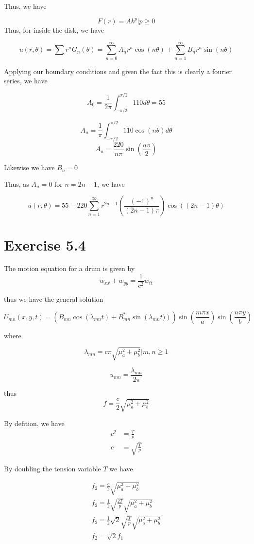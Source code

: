 \documentclass{article}
\begin{document}
Thus, we have

$$F(r) = A k^p\Bigr| p \geq 0$$
Thus, for inside the disk, we have

$$u(r,\theta) = \sum r^n G_n(\theta) = \sum_{n=0}^{\infty} A_n r^n \cos(n \theta) + \sum_{n=1}^{\infty} B_n r^n \sin (n\theta)$$

Applying our boundary conditions and given the fact this is clearly a fourier series, we have

$$A_0 = \frac{1}{2\pi} \int_{-\pi/2}^{\pi/2} 110 d\theta = 55$$

$$A_n= \frac{1}{\pi} \int_{-\pi/2}^{\pi/2} 110 \cos(n\theta) d\theta$$
$$A_n = \frac{220}{n \pi} \sin\left(\frac{n\pi}{2}\right)$$

Likewise we have $B_n = 0$

Thus, as $A_n=0$ for $n=2n-1$, we have

$$u(r,\theta) = 55 -220 \sum_{n=1}^{\infty} r^{2n-1} \left(\frac{(-1)^n}{(2n-1)\pi}\right) \cos((2n-1)\theta)$$



\section*{Exercise 5.4}
The motion equation for a drum is given by
$$
w_{xx}+w_{yy}=\frac{1}{c^2}w_{tt}
$$

thus we have the general solution

$$
U_{mn}(x,y,t) = \left(B_{mn}\cos(\lambda_{mn}t)+B^{*}_{mn}\sin\left(\lambda_{mn}t)\right)\right)\sin\left(\frac{m \pi x}{a}\right)\sin\left(\frac{n \pi y}{b}\right)
$$

where

$$
\lambda_{mn} = c\pi \sqrt{\mu_a^2 + \mu_b^2}\Bigr| m,n \geq 1
$$

$$
u_{mn} = \frac{\lambda_{mn}}{2\pi }
$$

thus
$$
f = \frac{c}{2} \sqrt{\mu_a^2 + \mu_b^2}
$$

By defition, we have 
\begin{align*}
c^2 &= \frac{T}{p}\\
c &= \sqrt{\frac{T}{p}}
\end{align*}

By doubling the tension variable $T$ we have

\begin{align*}
f_2 = \frac{c}{2} \sqrt{\mu_a^2 + \mu_b^2} \\
f_2 = \frac{1}{2} \sqrt{\frac{2T}{p}}\sqrt{\mu_a^2 + \mu_b^2} \\
f_2 = \frac{1}{2} \sqrt{2} \sqrt{\frac{T}{p}}\sqrt{\mu_a^2 + \mu_b^2} \\
f_2 = \sqrt{2} f_1
\end{align*}
\end{document}
